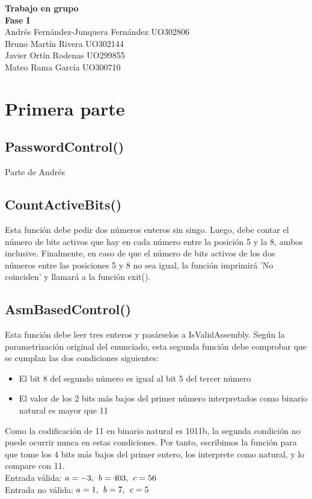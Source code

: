 \documentclass{article}
\begin{document}
\thispagestyle{empty}
\vfill
\begin{center}
    {\Huge \bfseries \sffamily Trabajo en grupo} \\[5ex]
    {\LARGE \bfseries \sffamily Fase I} \\[10ex]
    \Large {
        Andrés Fernández-Junquera Fernández UO302806\\[3ex]
        Bruno Martín Rivera UO302144\\[3ex]
        Javier Ortín Rodenas UO299855\\[3ex]
        Mateo Rama García UO300710
    }
\end{center}
\vfill 

\newpage

\tableofcontents

\newpage


\section{Primera parte}
\subsection{PasswordControl()}
Parte de Andrés
\subsection{CountActiveBits()}
Esta función debe pedir dos números enteros sin singo. Luego, debe contar el número de bits activos
que hay en cada número entre la posición 5 y la 8, ambos inclusive. Finalmente, en caso de que el 
número de bits activos de los dos números entre las posiciones 5 y 8  no sea igual, la función 
imprimirá 'No coinciden' y llamará a la función exit().
\subsection{AsmBasedControl()}
\hspace{1mm}
Esta función debe leer tres enteros y pasárselos a IsValidAssembly.
Según la parametrización original del enunciado, esta segunda función debe comprobar que se
cumplan las dos condiciones siguientes:
\begin{itemize}
    \item El bit 8 del segundo número es igual al bit 5 del tercer número
    \item El valor de los 2 bits más bajos del primer número interpretados como 
        binario natural es mayor que 11
\end{itemize}
Como la codificación de 11 en binario natural es 1011b, la segunda condición no puede
ocurrir nunca en estas condiciones. Por tanto, escribimos la función para que tome los 4 bits
más bajos del primer entero, los interprete como natural, y lo compare con 11.
\\[3ex]
\noindent Entrada válida: $a = -3, \hspace{1.5mm} b = 403, \hspace{1.5mm} c = 56$ \\[2ex]
\noindent Entrada no válida: $a = 1, \hspace{1.5mm} b = 7, \hspace{1.5mm} c = 5$
\end{document}
